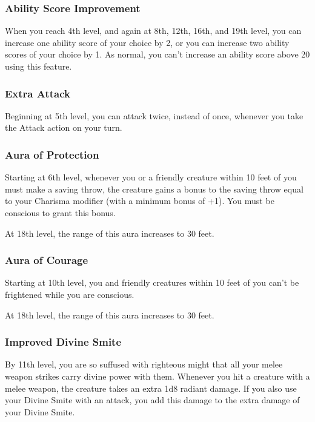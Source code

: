 \subsubsection{Ability Score Improvement}\label{vanguard-feature-asi}

When you reach 4th level, and again at 8th, 12th, 16th, and 19th level,
you can increase one ability score of your choice by 2, or you can
increase two ability scores of your choice by 1. As normal, you can't
increase an ability score above 20 using this feature.

\subsubsection{Extra Attack}\label{vanguard-feature-extra-attack}

Beginning at 5th level, you can attack twice, instead of once, whenever
you take the Attack action on your turn.

\subsubsection{Aura of
Protection}\label{vanguard-feature-aura-of-protection}

Starting at 6th level, whenever you or a friendly creature within 10
feet of you must make a saving throw, the creature gains a bonus to the
saving throw equal to your Charisma modifier (with a minimum bonus of
+1). You must be conscious to grant this bonus.

At 18th level, the range of this aura increases to 30 feet.

\subsubsection{Aura of Courage}\label{vanguard-feature-aura-of-courage}

Starting at 10th level, you and friendly creatures within 10 feet of you
can't be frightened while you are conscious.

At 18th level, the range of this aura increases to 30 feet.

\subsubsection{Improved Divine
Smite}\label{vanguard-feature-improved-divine-smite}

By 11th level, you are so suffused with righteous might that all your
melee weapon strikes carry divine power with them. Whenever you hit a
creature with a melee weapon, the creature takes an extra 1d8 radiant
damage. If you also use your Divine Smite with an attack, you add this
damage to the extra damage of your Divine Smite.

